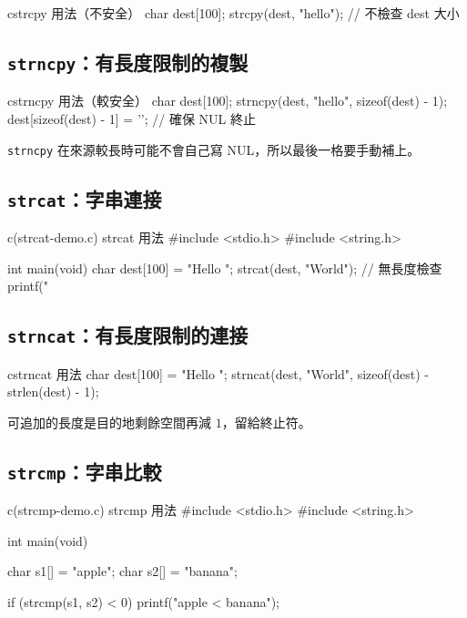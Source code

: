 \begin{code}{c}{strcpy 用法（不安全）}
char dest[100];
strcpy(dest, "hello");  // 不檢查 dest 大小
\end{code}

\subsection{\texttt{strncpy}：有長度限制的複製}

\begin{code}{c}{strncpy 用法（較安全）}
char dest[100];
strncpy(dest, "hello", sizeof(dest) - 1);
dest[sizeof(dest) - 1] = '\0';  // 確保 NUL 終止
\end{code}

\texttt{strncpy} 在來源較長時可能不會自己寫 NUL，所以最後一格要手動補上。

\subsection{\texttt{strcat}：字串連接}

\begin{example}{c}{(strcat-demo.c) strcat 用法}
#include <stdio.h>
#include <string.h>

int main(void) {
    char dest[100] = "Hello ";
    strcat(dest, "World");     // 無長度檢查
    printf("%
}
\end{example}


\subsection{\texttt{strncat}：有長度限制的連接}

\begin{code}{c}{strncat 用法}
char dest[100] = "Hello ";
strncat(dest, "World", sizeof(dest) - strlen(dest) - 1);
\end{code}

可追加的長度是目的地剩餘空間再減 $1$，留給終止符。

\subsection{\texttt{strcmp}：字串比較}

\begin{example}{c}{(strcmp-demo.c) strcmp 用法}
#include <stdio.h>
#include <string.h>

int main(void) {
    char s1[] = "apple";
    char s2[] = "banana";

    if (strcmp(s1, s2) < 0) {
        printf("apple < banana\n");
    }
}
\end{example}

